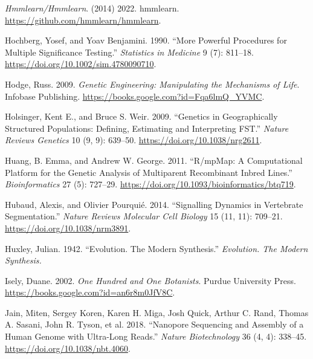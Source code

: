 \documentclass[
]{book}
\newlength{\cslhangindent}
\newlength{\cslentryspacingunit} %
\newenvironment{CSLReferences}[2] %
 {%
  \setlength{\parindent}{0pt}
  \ifodd #1
  \let\oldpar\par
  \def\par{\hangindent=\cslhangindent\oldpar}
  \fi
  \setlength{\parskip}{#2\cslentryspacingunit}
 }%
 {}
\begin{document}
\begin{CSLReferences}{1}{0}
\leavevmode{}%
\emph{Hmmlearn/Hmmlearn}. (2014) 2022. {hmmlearn}. \url{https://github.com/hmmlearn/hmmlearn}.

\leavevmode{}%
Hochberg, Yosef, and Yoav Benjamini. 1990. {``More Powerful Procedures for Multiple Significance Testing.''} \emph{Statistics in Medicine} 9 (7): 811--18. \url{https://doi.org/10.1002/sim.4780090710}.

\leavevmode{}%
Hodge, Russ. 2009. \emph{Genetic {Engineering}: {Manipulating} the {Mechanisms} of {Life}}. {Infobase Publishing}. \url{https://books.google.com?id=Fqa6lmQ_YVMC}.

\leavevmode{}%
Holsinger, Kent E., and Bruce S. Weir. 2009. {``Genetics in Geographically Structured Populations: Defining, Estimating and Interpreting {FST}.''} \emph{Nature Reviews Genetics} 10 (9, 9): 639--50. \url{https://doi.org/10.1038/nrg2611}.

\leavevmode{}%
Huang, B. Emma, and Andrew W. George. 2011. {``R/{mpMap}: A Computational Platform for the Genetic Analysis of Multiparent Recombinant Inbred Lines.''} \emph{Bioinformatics} 27 (5): 727--29. \url{https://doi.org/10.1093/bioinformatics/btq719}.

\leavevmode{}%
Hubaud, Alexis, and Olivier Pourquié. 2014. {``Signalling Dynamics in Vertebrate Segmentation.''} \emph{Nature Reviews Molecular Cell Biology} 15 (11, 11): 709--21. \url{https://doi.org/10.1038/nrm3891}.

\leavevmode{}%
Huxley, Julian. 1942. {``Evolution. {The} Modern Synthesis.''} \emph{Evolution. The Modern Synthesis.}

\leavevmode{}%
Isely, Duane. 2002. \emph{One {Hundred} and {One Botanists}}. {Purdue University Press}. \url{https://books.google.com?id=an6r8m0JfV8C}.

\leavevmode{}%
Jain, Miten, Sergey Koren, Karen H. Miga, Josh Quick, Arthur C. Rand, Thomas A. Sasani, John R. Tyson, et al. 2018. {``Nanopore Sequencing and Assembly of a Human Genome with Ultra-Long Reads.''} \emph{Nature Biotechnology} 36 (4, 4): 338--45. \url{https://doi.org/10.1038/nbt.4060}.


\end{CSLReferences}
\end{document}
